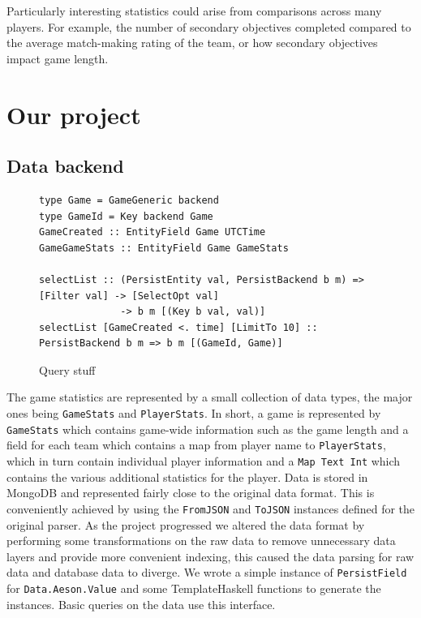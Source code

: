\documentclass[letterpaper,twocolumn,9pt]{article}
\newcommand{\code}[1]{\texttt{#1}}
\begin{document}
Particularly interesting statistics could arise from comparisons across many players.  For example, the number of secondary objectives completed compared to the average match-making rating of the team, or how secondary objectives impact game length.

\section{Our project}
\label{package}

\subsection{Data backend}

\begin{figure}[t]
\footnotesize{
\begin{verbatim}
type Game = GameGeneric backend
type GameId = Key backend Game
GameCreated :: EntityField Game UTCTime
GameGameStats :: EntityField Game GameStats

selectList :: (PersistEntity val, PersistBackend b m) => [Filter val] -> [SelectOpt val]
              -> b m [(Key b val, val)]
selectList [GameCreated <. time] [LimitTo 10] :: PersistBackend b m => b m [(GameId, Game)]
\end{verbatim}
}
    \caption{Query stuff}
    \label{querycode}
\end{figure}

The game statistics are represented by a small collection of data types, the major ones being \code{GameStats} and \code{PlayerStats}.  In short, a game is represented by \code{GameStats} which contains game-wide information such as the game length and a field for each team which contains a map from player name to \code{PlayerStats}, which in turn contain individual player information and a \code{Map Text Int} which contains the various additional statistics for the player.  Data is stored in MongoDB and represented fairly close to the original data format.  This is conveniently achieved by using the \code{FromJSON} and \code{ToJSON} instances defined for the original parser.  As the project progressed we altered the data format by performing some transformations on the raw data to remove unnecessary data layers and provide more convenient indexing, this caused the data parsing for raw data and database data to diverge.  We wrote a simple instance of \code{PersistField} for \code{Data.Aeson.Value} and some TemplateHaskell functions to generate the instances.  Basic queries on the data use this interface.
\end{document}
